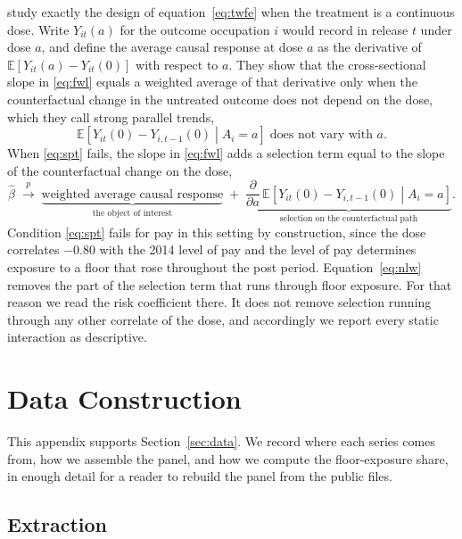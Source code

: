 \documentclass[12pt,leqno]{article}
\begin{document}
\citet{callaway2024continuous} study exactly the design of equation~\eqref{eq:twfe} when the treatment is a continuous dose. Write $Y_{it}(a)$ for the outcome occupation $i$ would record in release $t$ under dose $a$, and define the average causal response at dose $a$ as the derivative of $\mathbb{E}[Y_{it}(a) - Y_{it}(0)]$ with respect to $a$. They show that the cross-sectional slope in \eqref{eq:fwl} equals a weighted average of that derivative only when the counterfactual change in the untreated outcome does not depend on the dose, which they call strong parallel trends,
\begin{equation}\label{eq:spt}
\mathbb{E}\!\left[\left. Y_{it}(0) - Y_{i,t-1}(0) \;\right|\; A_i = a \right] \; \text{does not vary with } a .
\end{equation}
When \eqref{eq:spt} fails, the slope in \eqref{eq:fwl} adds a selection term equal to the slope of the counterfactual change on the dose,
\begin{equation}
\hat{\beta} \;\xrightarrow{p}\; \underbrace{\text{weighted average causal response}}_{\text{the object of interest}} \;+\; \underbrace{\frac{\partial}{\partial a}\,\mathbb{E}\!\left[\left. Y_{it}(0) - Y_{i,t-1}(0) \;\right|\; A_i = a \right]}_{\text{selection on the counterfactual path}} .
\end{equation}
Condition \eqref{eq:spt} fails for pay in this setting by construction, since the dose correlates $-0.80$ with the 2014 level of pay and the level of pay determines exposure to a floor that rose throughout the post period. Equation~\eqref{eq:nlw} removes the part of the selection term that runs through floor exposure. For that reason we read the risk coefficient there. It does not remove selection running through any other correlate of the dose, and accordingly we report every static interaction as descriptive.

\section{Data Construction}\label{app:data}

This appendix supports Section~\ref{sec:data}. We record where each series comes from, how we assemble the panel, and how we compute the floor-exposure share, in enough detail for a reader to rebuild the panel from the public files.



\subsection{Extraction}
\end{document}
